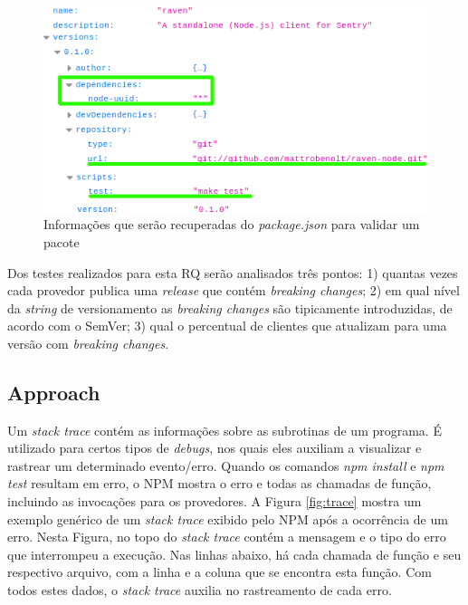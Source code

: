 \begin{figure}
    \centering
    \includegraphics[scale=0.7]{figuras/package_json.png}
    \caption{Informações que serão recuperadas do \textit{package.json} para validar um pacote}
    \label{fig:package_json}
\end{figure}{}

Dos testes realizados para esta RQ serão analisados três pontos: 1) quantas vezes cada provedor publica uma \textit{release} que contém \textit{breaking changes}; 2) em qual nível da \textit{string} de versionamento as \textit{breaking changes} são tipicamente introduzidas, de acordo com o \Gls{SemVer}; 3) qual o percentual de clientes que atualizam para uma versão com \textit{breaking changes}.

\subsection{Approach}
\label{apr:rq1}

Um \textit{stack trace} contém as informações sobre as subrotinas de um programa. É utilizado para certos tipos de \textit{debugs}, nos quais eles auxiliam a visualizar e rastrear um determinado evento/erro. Quando os comandos \textit{npm install} e \textit{npm test} resultam em erro, o \Gls{NPM} mostra o erro e todas as chamadas de função, incluindo as invocações para os provedores. A Figura \ref{fig:trace} mostra um exemplo genérico de um \textit{stack trace} exibido pelo \Gls{NPM} após a ocorrência de um erro. Nesta Figura, no topo do \textit{stack trace} contém a mensagem e o tipo do erro que interrompeu a execução. Nas linhas abaixo, há cada chamada de função e seu respectivo arquivo, com a linha e a coluna que se encontra esta função. Com todos estes dados, o \textit{stack trace} auxilia no rastreamento de cada erro.

